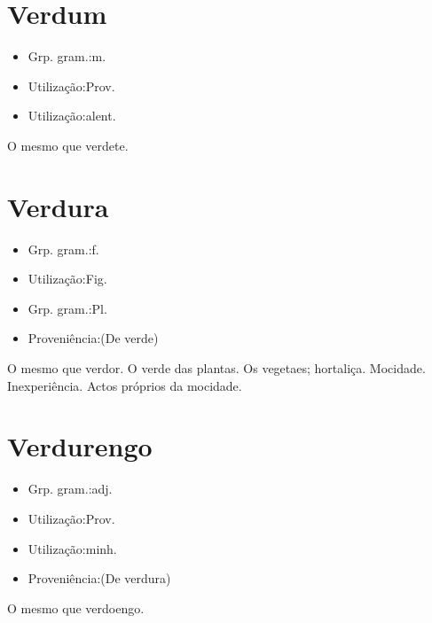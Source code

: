 \documentclass{article}
\begin{document}
\section{Verdum}
\begin{itemize}
\item {Grp. gram.:m.}
\end{itemize}
\begin{itemize}
\item {Utilização:Prov.}
\end{itemize}
\begin{itemize}
\item {Utilização:alent.}
\end{itemize}
O mesmo que \textunderscore verdete\textunderscore .
\section{Verdura}
\begin{itemize}
\item {Grp. gram.:f.}
\end{itemize}
\begin{itemize}
\item {Utilização:Fig.}
\end{itemize}
\begin{itemize}
\item {Grp. gram.:Pl.}
\end{itemize}
\begin{itemize}
\item {Proveniência:(De \textunderscore verde\textunderscore )}
\end{itemize}
O mesmo que \textunderscore verdor\textunderscore .
O verde das plantas.
Os vegetaes; hortaliça.
Mocidade.
Inexperiência.
Actos próprios da mocidade.
\section{Verdurengo}
\begin{itemize}
\item {Grp. gram.:adj.}
\end{itemize}
\begin{itemize}
\item {Utilização:Prov.}
\end{itemize}
\begin{itemize}
\item {Utilização:minh.}
\end{itemize}
\begin{itemize}
\item {Proveniência:(De \textunderscore verdura\textunderscore )}
\end{itemize}
O mesmo que \textunderscore verdoengo\textunderscore .
\end{document}
